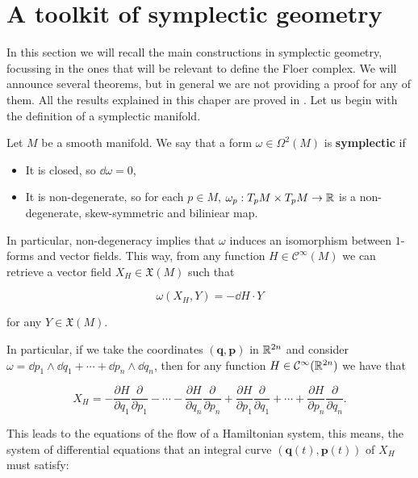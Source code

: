 \section{A toolkit of symplectic geometry}

In this section we will recall the main constructions in symplectic geometry, focussing in the ones that will be relevant to define the Floer complex. We will announce several theorems, but in general we are not providing a proof for any of them. All the results explained in this chaper are proved in \cite{da2001lectures}. Let us begin with the definition of a symplectic manifold.

\begin{deff}
Let $M$ be a smooth manifold. We say that a form $\omega \in \Omega^2(M)$ is {\bf symplectic} if

\begin{itemize}
	\item It is closed, so $\dd \omega = 0$,
	\item It is non-degenerate, so for each $p \in M$, $\omega_p : T_pM \times T_pM \rightarrow \mathbb{R}$ is a non-degenerate, skew-symmetric and biliniear map.
\end{itemize}
\end{deff}

In particular, non-degeneracy implies that $\omega$ induces an isomorphism between $1$-forms and vector fields. This way, from any function $H \in \mathcal{C}^{\infty}(M)$ we can retrieve a vector field $X_H \in \mathfrak{X}(M)$ such that

$$\omega(X_H,Y) = - \dd H \cdot Y$$

for any $Y \in \mathfrak{X}(M)$.

In particular, if we take the coordinates $(\mathbf{q},\mathbf{p})$ in $\mathbb{R}^{2n}$ and consider $\omega = \dd p_1 \wedge \dd q_1 + \cdots + \dd p_n \wedge \dd q_n$, then for any function $H \in \mathcal{C}^{\infty}(\mathbb{R}^{2n})$ we have that

$$X_H = - \frac{\partial H}{\partial q_1} \frac{\partial}{\partial p_1} - \cdots - \frac{\partial H}{\partial q_n} \frac{\partial}{\partial p_n} + \frac{\partial H}{\partial p_1} \frac{\partial}{\partial q_1} + \cdots + \frac{\partial H}{\partial p_n} \frac{\partial}{\partial q_n} .$$

This leads to the equations of the flow of a Hamiltonian system, this means, the system of differential equations that an integral curve $(\mathbf{q}(t),\mathbf{p}(t))$ of $X_H$ must satisfy:

